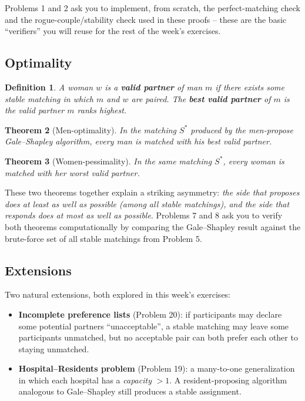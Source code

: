 \documentclass[11pt]{article}
\newtheorem{theorem}{Theorem}[section]
\newtheorem{definition}[theorem]{Definition}
\begin{document}
Problems 1 and 2 ask you to implement, from scratch, the perfect-matching check and the
rogue-couple/stability check used in these proofs -- these are the basic ``verifiers'' you
will reuse for the rest of the week's exercises.

\subsection{Optimality}

\begin{definition}
A woman $w$ is a \textbf{valid partner} of man $m$ if there exists \emph{some} stable
matching in which $m$ and $w$ are paired. The \textbf{best valid partner} of $m$ is the
valid partner $m$ ranks highest.
\end{definition}

\begin{theorem}[Men-optimality]
In the matching $S^{*}$ produced by the men-propose Gale--Shapley algorithm, every man is
matched with his best valid partner.
\end{theorem}

\begin{theorem}[Women-pessimality]
In the same matching $S^{*}$, every woman is matched with her \emph{worst} valid partner.
\end{theorem}

These two theorems together explain a striking asymmetry: \emph{the side that proposes
does at least as well as possible (among all stable matchings), and the side that
responds does at most as well as possible}. Problems 7 and 8 ask you to verify both
theorems computationally by comparing the Gale--Shapley result against the brute-force set
of all stable matchings from Problem 5.

\subsection{Extensions}

Two natural extensions, both explored in this week's exercises:

\begin{itemize}
    \item \textbf{Incomplete preference lists} (Problem 20): if participants may declare
    some potential partners ``unacceptable'', a stable matching may leave some
    participants unmatched, but no acceptable pair can both prefer each other to staying
    unmatched.
    \item \textbf{Hospital--Residents problem} (Problem 19): a many-to-one generalization
    in which each hospital has a \emph{capacity} $> 1$. A resident-proposing algorithm
    analogous to Gale--Shapley still produces a stable assignment.
\end{itemize}
\end{document}
